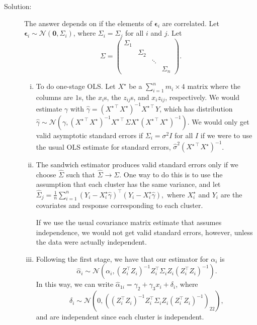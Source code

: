 \documentclass[11pt, letterpaper]{article}
\begin{document}
\begin{enumerate}[(a)]
\begin{description}
\item[Solution:] The answer depends on if the elements of $\bm\epsilon_i$ are
  correlated. Let $\bm\epsilon_i \sim \mathcal{N}\left(\bm 0, \Sigma_i\right)$,
  where $\Sigma_i = \Sigma_j$ for all $i$ and $j$. Let
  \begin{equation}
    \Sigma = \begin{pmatrix}
      \Sigma_1 & & &\\
      & \Sigma_2 & &\\
      & & \ddots &\\
      & & & \Sigma_n      
    \end{pmatrix}.
  \end{equation}
  
  \begin{enumerate}[i.]
  \item To do one-stage OLS. Let $X^\star$ be a $\sum_{i=1}^n m_i \times 4$
    matrix where the columns are $1$s, the $x_i$s, the $z_{ij}$s, and
    $x_iz_{ij}$, respectively. We would estimate $\gamma$ with
    $\hat{\gamma} =
    \left(X^{\star\intercal}X^\star\right)^{-1}X^{\star\intercal}Y$, which has
    distribution
    $\hat{\gamma} \sim \mathcal{N}\left(\gamma,
      \left(X^{\star\intercal}X^\star\right)^{-1}X^{\star\intercal}\Sigma
      X^{\star}\left(X^{\star\intercal}X^\star\right)^{-1}\right)$. We would
    only get valid asymptotic standard errors if $\Sigma_i = \sigma^2I$ for all
    $I$ if we were to use the usual OLS estimate for standard errors,
    $\hat{\sigma}^2\left(X^{\star\intercal} X^\star\right)^{-1}$.
  \item The sandwich estimator produces valid standard errors only if
    we choose $\hat{\Sigma}$ such that $\hat{\Sigma} \rightarrow \Sigma$. One
    way to do this is to use the assumption that each cluster has the same
    variance, and let
    $\hat{\Sigma}_j = \frac{1}{n}\sum_{i=1}^n\left(Y_i -
      X^\star_i\hat{\gamma}\right)^\intercal\left( Y_i - X^\star_i\hat{\gamma}
    \right),$ where $X^\star_i$ and $Y_i$ are the covariates and response
    corresponding to each cluster.

    If we use the usual covariance matrix estimate that assumes independence, we
    would not get valid standard errors, however, unless the data were actually
    independent.
  \item Following the first stage, we have that our estimator for $\alpha_i$ is
    \begin{equation}
      \hat{\alpha}_i \sim \mathcal{N}\left(
        \alpha_i, \left(Z_i^\intercal Z_i\right)^{-1}Z_i^\intercal\Sigma_i Z_i\left(Z_i^\intercal Z_i\right)^{-1}
      \right).
    \end{equation}
    In this way, we can write
    $\hat{\alpha}_{1i} = \gamma_2 + \gamma_3x_i + \delta_i$, where
    $$\delta_i \sim \mathcal{N}\left(0, \left(\left(Z_i^\intercal
          Z_i\right)^{-1}Z_i^\intercal\Sigma_i Z_i\left(Z_i^\intercal
          Z_i\right)^{-1}\right)_{22}\right),$$ and are independent since each
    cluster is independent.
    

\end{enumerate}
\end{description}
\end{enumerate}
\end{document}
